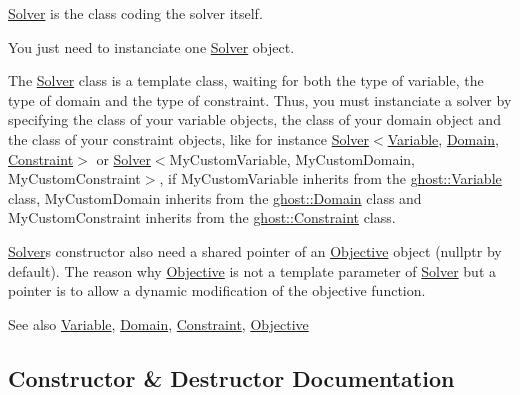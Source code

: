 \hyperlink{classghost_1_1Solver}{Solver} is the class coding the solver itself. 

You just need to instanciate one \hyperlink{classghost_1_1Solver}{Solver} object.

The \hyperlink{classghost_1_1Solver}{Solver} class is a template class, waiting for both the type of variable, the type of domain and the type of constraint. Thus, you must instanciate a solver by specifying the class of your variable objects, the class of your domain object and the class of your constraint objects, like for instance \hyperlink{classghost_1_1Solver}{Solver}$<$\hyperlink{classghost_1_1Variable}{Variable}, \hyperlink{classghost_1_1Domain}{Domain}, \hyperlink{classghost_1_1Constraint}{Constraint}$>$ or \hyperlink{classghost_1_1Solver}{Solver}$<$My\+Custom\+Variable, My\+Custom\+Domain, My\+Custom\+Constraint$>$, if My\+Custom\+Variable inherits from the \hyperlink{classghost_1_1Variable}{ghost\+::\+Variable} class, My\+Custom\+Domain inherits from the \hyperlink{classghost_1_1Domain}{ghost\+::\+Domain} class and My\+Custom\+Constraint inherits from the \hyperlink{classghost_1_1Constraint}{ghost\+::\+Constraint} class.

\hyperlink{classghost_1_1Solver}{Solver}\textquotesingle{}s constructor also need a shared pointer of an \hyperlink{classghost_1_1Objective}{Objective} object (nullptr by default). The reason why \hyperlink{classghost_1_1Objective}{Objective} is not a template parameter of \hyperlink{classghost_1_1Solver}{Solver} but a pointer is to allow a dynamic modification of the objective function.

\begin{DoxySeeAlso}{See also}
\hyperlink{classghost_1_1Variable}{Variable}, \hyperlink{classghost_1_1Domain}{Domain}, \hyperlink{classghost_1_1Constraint}{Constraint}, \hyperlink{classghost_1_1Objective}{Objective} 
\end{DoxySeeAlso}


\subsection{Constructor \& Destructor Documentation}
